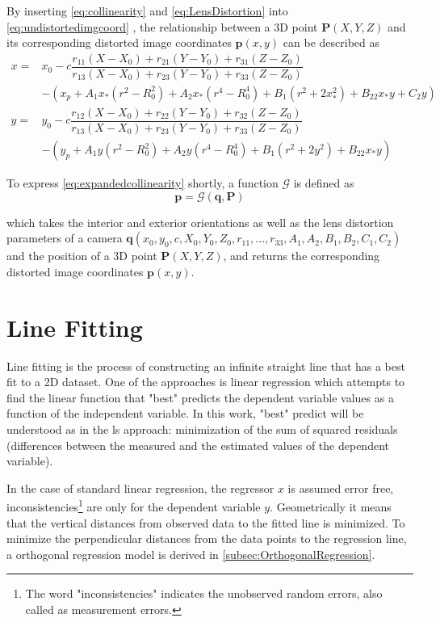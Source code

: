 By inserting \eqref{eq:collinearity} and \eqref{eq:LensDistortion} into \eqref{eq:undistortedimgcoord} , the relationship between a 3D point $\mathbf{P}(X, Y, Z)$ and its corresponding distorted image coordinates $\mathbf{p}(x,y)$ can be described as
\begin{equation} \label{eq:expandedcollinearity}
\begin{split}
x =& x_0-c\dfrac{r_{11}(X-X_0)+r_{21}(Y-Y_0)+r_{31}(Z-Z_0)}{r_{13}(X-X_0)+r_{23}(Y-Y_0)+r_{33}(Z-Z_0)} \\
&-(x_p + A_1x_*(r^2-R_0^2) + A_2x_*(r^4-R_0^4) + B_1(r^2+2x_*^2) + B_22x_*y+C_2y)\\
y =& y_0-c\dfrac{r_{12}(X-X_0)+r_{22}(Y-Y_0)+r_{32}(Z-Z_0)}{r_{13}(X-X_0)+r_{23}(Y-Y_0)+r_{33}(Z-Z_0)} \\
&-(y_p + A_1y  (r^2-R_0^2) + A_2y  (r^4-R_0^4) + B_1(r^2+2y^2)   + B_22x_*y)
\end{split}
\end{equation}

To express \eqref{eq:expandedcollinearity} shortly, a function $\mathcal{G}$ is defined as
\begin{equation} \label{eq:Gfunction}
\mathbf{p} = \mathcal{G}(\mathbf{q},\mathbf{P}) 
\end{equation}

which takes the interior and exterior orientations as well as the lens distortion parameters of a camera $\mathbf{q}(x_0,y_0,c,X_0,Y_0,Z_0,r_{11},...,r_{33},A_1,A_2,B_1,B_2,C_1,C_2)$ and the position of a 3D point $\mathbf{P}(X, Y, Z)$, and returns the corresponding distorted image coordinates $\mathbf{p}(x,y)$.

\clearpage
\section{Line Fitting}
\label{sec:LineFitting}

Line fitting is the process of constructing an infinite straight line that has a best fit to a 2D dataset. One of the approaches is linear regression which attempts to find the linear function that "best" predicts the dependent variable values as a function of the independent variable. In this work, "best" predict will be understood as in the \gls{ls} approach: minimization of the sum of squared residuals (differences between the measured and the estimated values of the dependent variable).

In the case of standard linear regression, the regressor $x$ is assumed error free, inconsistencies\footnote{The word "inconsistencies" indicates the unobserved random errors, also called as measurement errors.} are only for the dependent variable $y$. Geometrically it means that the vertical distances from observed data to the fitted line is minimized. To minimize the perpendicular distances from the data points to the regression line, a orthogonal regression model is derived in \cref{subsec:OrthogonalRegression}.

